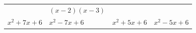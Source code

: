 {\begin{tabular}[t]{|l|l|l|l|}
               &
                $\left(x-2\right)\left(x-3\right)$
     \tabularnewline\cline{1-1}\cline{2-2}\cline{3-3}\cline{4-4}
                ${x}^{2}+7x+6$
               &
                ${x}^{2}-7x+6$
               &
                \uline{
                  ${x}^{2}+5x+6$
                }
               &
                ${x}^{2}-5x+6$
     \tabularnewline\cline{1-1}\cline{2-2}\cline{3-3}\cline{4-4}
    \end{tabular}} %
        \addtolength{\mytableboxheight}{\mytableboxdepth}
